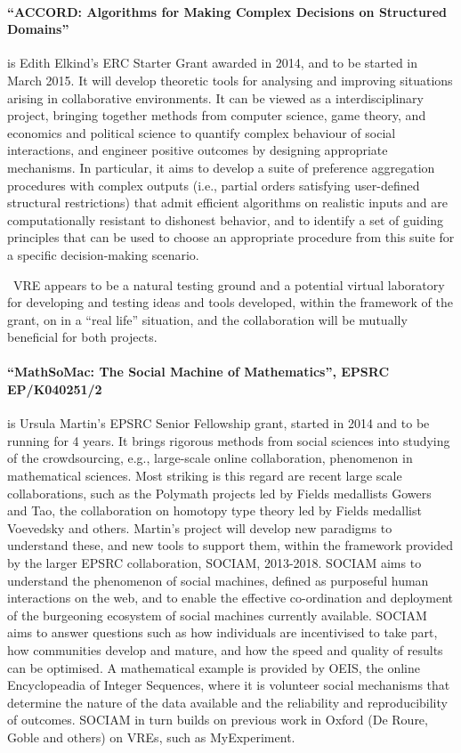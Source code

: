 \paragraph{``ACCORD: Algorithms for Making Complex Decisions on Structured Domains''}
is Edith Elkind's ERC Starter Grant
awarded in 2014, and to be started in March 2015. It
will develop theoretic tools for analysing and improving situations
arising in collaborative environments.
It can be viewed as a interdisciplinary project, bringing together methods from
computer science, game theory, and economics and political science
to quantify complex behaviour of social interactions, and engineer
positive outcomes by designing appropriate mechanisms.
In particular, it aims to develop a suite of preference aggregation procedures with complex outputs (i.e.,
partial orders satisfying user-defined structural restrictions) that admit efficient algorithms on realistic
inputs and are computationally resistant to dishonest behavior, and to identify a set of guiding
principles that can be used to choose an appropriate procedure from this suite for a specific decision-making
scenario.

\TheProject\ VRE appears to be a natural testing ground and a potential virtual
laboratory for developing and testing ideas and tools developed, within the
framework of the grant, on in a ``real life'' situation, and the collaboration
will be mutually beneficial for both projects.


\paragraph{``MathSoMac: The Social Machine of Mathematics'', EPSRC EP/K040251/2}
is Ursula Martin's EPSRC Senior Fellowship grant, started in
2014 and to be running for 4 years. It brings rigorous methods from social
sciences into studying of the crowdsourcing, e.g., large-scale online
collaboration, phenomenon in mathematical sciences.  Most striking is this
regard are recent large scale collaborations, such as the Polymath projects led
by Fields medallists Gowers and Tao, the collaboration on homotopy type theory
led by Fields medallist Voevedsky and others.  Martin’s project will develop
new paradigms to understand these, and new tools to support them, within the
framework provided by the larger EPSRC collaboration, SOCIAM, 2013-2018. SOCIAM
aims to understand the phenomenon of social machines, defined as purposeful
human interactions on the web, and to enable the effective co-ordination and
deployment of the burgeoning ecosystem of social machines currently available.
SOCIAM aims to answer questions such as how individuals are incentivised to
take part, how communities develop and mature, and how the speed and quality of
results can be optimised. A mathematical example is provided by OEIS, the
online Encyclopeadia of Integer Sequences, where it is volunteer social
mechanisms that determine the nature of the data available and the reliability
and reproducibility of outcomes.  SOCIAM in turn builds on previous work in
Oxford (De Roure, Goble and others) on VREs, such as MyExperiment.

